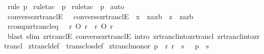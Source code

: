 \begin{isabellebody}
\ {\isacharparenleft}rule\ p{}{\isacharparenright}\isanewline
{}\isamarkupfalse%
\ {\isacharparenleft}rule{\isacharunderscore}tac\ {\isacharbrackleft}{}{\isacharbrackright}\ p{}{\isacharparenright}\isanewline
{}\isamarkupfalse%
\ {\isacharparenleft}rule{\isacharunderscore}tac\ {\isacharbrackleft}{}{\isacharbrackright}\ p{}{\isacharparenright}\isanewline
{}\isamarkupfalse%
\ auto\isanewline
{}\isamarkupfalse%
%
\endisatagproof
{\isafoldproof}%
%
\isadelimproof
\isanewline
%
\endisadelimproof
\isanewline
{}\isamarkupfalse%
\ converse{\isacharunderscore}zrtranclE{}\ {\isacharequal}\ \ converse{\isacharunderscore}zrtranclE\ {\isacharbrackleft}\ x\ {\isacharequal}\ {\isachardoublequoteopen}{\isacharparenleft}xa{\isacharcomma}xb{\isacharparenright}{\isachardoublequoteclose}\ \ z\ {\isacharequal}\ {\isachardoublequoteopen}{\isacharparenleft}za{\isacharcomma}zb{\isacharparenright}{\isachardoublequoteclose}{\isacharbrackright}\ \isanewline
\isanewline
{}\isamarkupfalse%
\ r{\isacharunderscore}comp{\isacharunderscore}zrtrancl{\isacharunderscore}eq\ {\isacharcolon}\ \ {\isachardoublequoteopen}r\ O\ r{\isacharpercent}{\isacharasterisk}\ {\isacharequal}\ r{\isacharpercent}{\isacharasterisk}\ O\ r{\isachardoublequoteclose}\isanewline
%
\isadelimproof
%
\endisadelimproof
%
\isatagproof
{}\isamarkupfalse%
\ {\isacharparenleft}blast\ elim{\isacharcolon}\ zrtranclE\ converse{\isacharunderscore}zrtranclE\ intro{\isacharcolon}\ zrtrancl{\isacharunderscore}into{\isacharunderscore}zrtrancl\ zrtrancl{\isacharunderscore}into{\isacharunderscore}zrtrancl{}{\isacharparenright}\isanewline
{}\isamarkupfalse%
%
\endisatagproof
{\isafoldproof}%
%
\isadelimproof
%
\endisadelimproof
%
\isamarkupsubsection{$^+$%
}
\isamarkuptrue%
\isamarkupfalse%
\ ztrancl{\isacharunderscore}def\ {\isacharequal}\ trans{\isacharunderscore}clos{\isacharunderscore}def\isanewline
\isanewline
{}\isamarkupfalse%
\ ztrancl{\isacharunderscore}mono{\isacharcolon}{\isachardoublequoteopen}{\isacharbang}{\isacharbang}r{\isachardot}{\isacharbrackleft}{\isacharbar}\ p\ {\isacharcolon}\ r{\isacharpercent}{\isacharplus}{\isacharsemicolon}\ r\ {\isacharless}{\isacharequal}\ s\ {\isacharbar}{\isacharbrackright}\ {\isacharequal}{\isacharequal}{\isachargreater}\ p\ {\isacharcolon}\ s{\isacharpercent}{\isacharplus}{\isachardoublequoteclose}\isanewline

\end{isabellebody}
